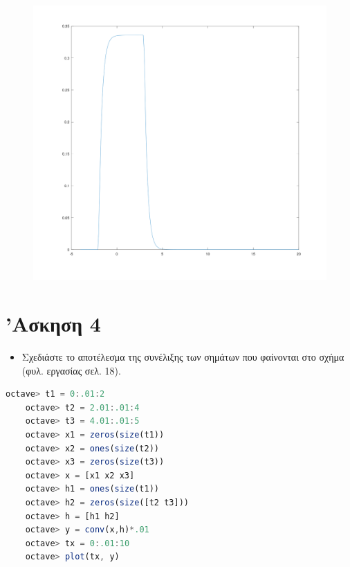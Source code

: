 \documentclass{article}
\begin{document}
\begin{figure}[H]
	\centering
	\includegraphics[width=\linewidth]{res/fig3.png}
\end{figure}

\section{'Ασκηση 4}

\begin{itemize}
        \item Σχεδιάστε το αποτέλεσμα της συνέλιξης των σημάτων που φαίνονται
		στο σχήμα (φυλ. εργασίας σελ. 18).
\end{itemize}

\begin{lstlisting}[language=octave]
	octave> t1 = 0:.01:2
	octave> t2 = 2.01:.01:4
	octave> t3 = 4.01:.01:5
	octave> x1 = zeros(size(t1))
	octave> x2 = ones(size(t2))
	octave> x3 = zeros(size(t3))
	octave> x = [x1 x2 x3]
	octave> h1 = ones(size(t1))
	octave> h2 = zeros(size([t2 t3]))
	octave> h = [h1 h2]
	octave> y = conv(x,h)*.01
	octave> tx = 0:.01:10
	octave> plot(tx, y)
\end{lstlisting}
\end{document}
